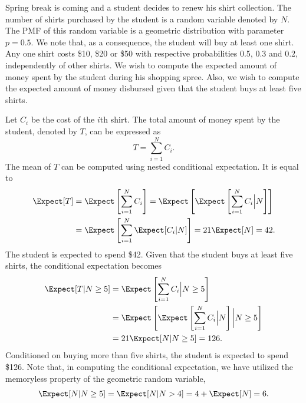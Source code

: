 \begin{example}
Spring break is coming and a student decides to renew his shirt collection.
The number of shirts purchased by the student is a random variable denoted by $N$.
The PMF of this random variable is a geometric distribution with parameter $p = 0.5$.
We note that, as a consequence, the student will buy at least one shirt.
Any one shirt costs \$10, \$20 or \$50 with respective probabilities 0.5, 0.3 and 0.2, independently of other shirts.
We wish to compute the expected amount of money spent by the student during his shopping spree.
Also, we wish to compute the expected amount of money disbursed given that the student buys at least five shirts.

Let $C_i$ be the cost of the $i$th shirt.
The total amount of money spent by the student, denoted by $T$, can be expressed as
\begin{equation*}
T = \sum_{i=1}^N C_i .
\end{equation*}
The mean of $T$ can be computed using nested conditional expectation.
It is equal to
\begin{equation*}
\begin{split}
\Expect [T] &= \Expect \left[ \sum_{i=1}^N C_i \right]
= \Expect \left[ \Expect \left[
\sum_{i=1}^N C_i \Big| N \right] \right] \\
&= \Expect \left[ \sum_{i=1}^N \Expect [ C_i | N ] \right]
= 21 \Expect [ N ] = 42.
\end{split}
\end{equation*}
The student is expected to spend \$42.
Given that the student buys at least five shirts, the conditional expectation becomes
\begin{equation*}
\begin{split}
\Expect [T | N \geq 5]
&= \Expect \left[ \sum_{i=1}^N C_i \Big| N \geq 5 \right] \\
&= \Expect \left[ \Expect \left[
\sum_{i=1}^N C_i \Big| N \right] \bigg| N \geq 5 \right] \\
&= 21 \Expect [ N | N \geq 5]
= 126 .
\end{split}
\end{equation*}
Conditioned on buying more than five shirts, the student is expected to spend \$126.
Note that, in computing the conditional expectation, we have utilized the memoryless property of the geometric random variable,
\begin{equation*}
\Expect [ N | N \geq 5] = \Expect [ N | N > 4] = 4 + \Expect [ N ] = 6 .
\end{equation*}
\end{example}


